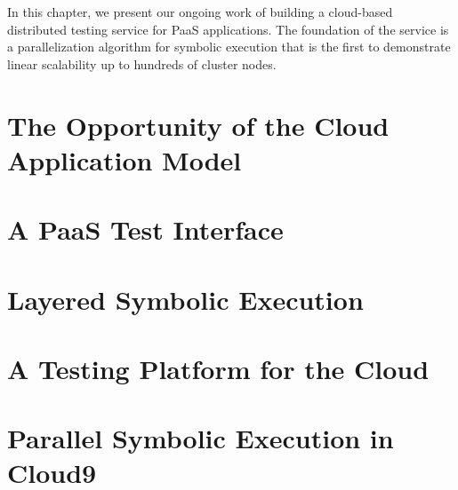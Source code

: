 In this chapter, we present our ongoing work of building a cloud-based distributed testing service for PaaS applications.  The foundation of the service is a parallelization algorithm for symbolic execution that is the first to demonstrate linear scalability up to hundreds of cluster nodes.

\section{The Opportunity of the Cloud Application Model}


\section{A PaaS Test Interface}
\label{sec:paas:abstractions}


\section{Layered Symbolic Execution}
\label{sec:paas:layeredsymbex}


\section{A Testing Platform for the Cloud}
\label{sec:paas:fedsymbex}


\section{Parallel Symbolic Execution in Cloud9}
\label{sec:paas:parsymbex}



